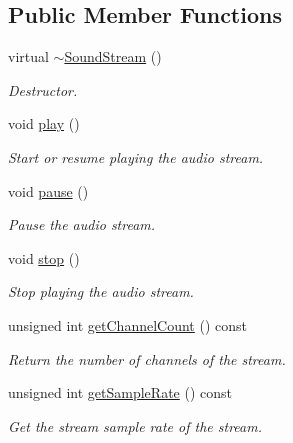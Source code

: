 \subsection*{Public Member Functions}
\begin{DoxyCompactItemize}
\item 
\hypertarget{classsf_1_1SoundStream_a1fafb9f1ca572d23d7d6a17921860d85}{virtual \hyperlink{classsf_1_1SoundStream_a1fafb9f1ca572d23d7d6a17921860d85}{$\sim$\-Sound\-Stream} ()}\label{classsf_1_1SoundStream_a1fafb9f1ca572d23d7d6a17921860d85}

\begin{DoxyCompactList}\small\item\em Destructor. \end{DoxyCompactList}\item 
void \hyperlink{classsf_1_1SoundStream_afdc08b69cab5f243d9324940a85a1144}{play} ()
\begin{DoxyCompactList}\small\item\em Start or resume playing the audio stream. \end{DoxyCompactList}\item 
void \hyperlink{classsf_1_1SoundStream_a932ff181e661503cad288b4bb6fe45ca}{pause} ()
\begin{DoxyCompactList}\small\item\em Pause the audio stream. \end{DoxyCompactList}\item 
void \hyperlink{classsf_1_1SoundStream_a16cc6a0404b32e42c4dce184bb94d0f4}{stop} ()
\begin{DoxyCompactList}\small\item\em Stop playing the audio stream. \end{DoxyCompactList}\item 
unsigned int \hyperlink{classsf_1_1SoundStream_a68dedd0a2c26e6937c80fab3d235edea}{get\-Channel\-Count} () const 
\begin{DoxyCompactList}\small\item\em Return the number of channels of the stream. \end{DoxyCompactList}\item 
unsigned int \hyperlink{classsf_1_1SoundStream_aad1da51c7a752682ca208bf11e3349bb}{get\-Sample\-Rate} () const 
\begin{DoxyCompactList}\small\item\em Get the stream sample rate of the stream. \end{DoxyCompactList}\item 

\end{DoxyCompactItemize}
